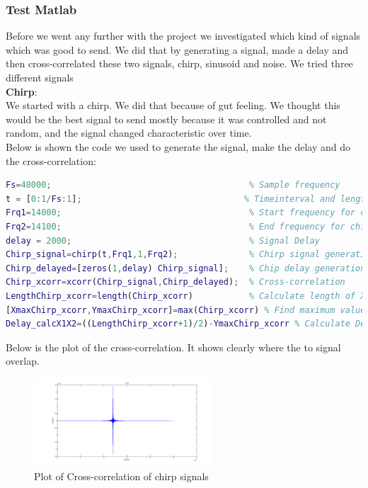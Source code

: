\subsubsection{Test Matlab}
Before we went any further with the project we investigated which kind of signals which was good to send. We did that by generating a signal, made a delay and then cross-correlated these two signals, chirp, sinusoid and noise.
We tried three different signals\\
\textbf{Chirp}:\\
We started with a chirp. We did that because of gut feeling. We thought this would be the best signal to send mostly because it was controlled and not random, and the signal changed characteristic over time.\\
Below is shown the code we used to generate the signal, make the delay and do the cross-correlation:
\begin{lstlisting}[language=Matlab,frame=lrtb,label=Matlab Code for Chirp Cross-correlation]
Fs=48000;                                       % Sample frequency
t = [0:1/Fs:1];                                % Timeinterval and length
Frq1=14000;                                     % Start frequency for chirp
Frq2=14100;                                     % End frequency for chirp
delay = 2000;                                   % Signal Delay
Chirp_signal=chirp(t,Frq1,1,Frq2);              % Chirp signal generation
Chirp_delayed=[zeros(1,delay) Chirp_signal];    % Chip delay generation
Chirp_xcorr=xcorr(Chirp_signal,Chirp_delayed);  % Cross-correlation
LengthChirp_xcorr=length(Chirp_xcorr)           % Calculate length of Xcorr
[XmaxChirp_xcorr,YmaxChirp_xcorr]=max(Chirp_xcorr) % Find maximum value
Delay_calcX1X2=((LengthChirp_xcorr+1)/2)-YmaxChirp_xcorr % Calculate Delay
\end{lstlisting}
Below is the plot of the cross-correlation. It shows clearly where the to signal overlap.\\
\begin{figure}[H]
\centering
\includegraphics[width=0.6\textwidth]{billeder/chirp_xcorr_fig}
\caption{Plot of Cross-correlation of chirp signals}
\label{fig:chirp_xcorr_plot}
\end{figure}
